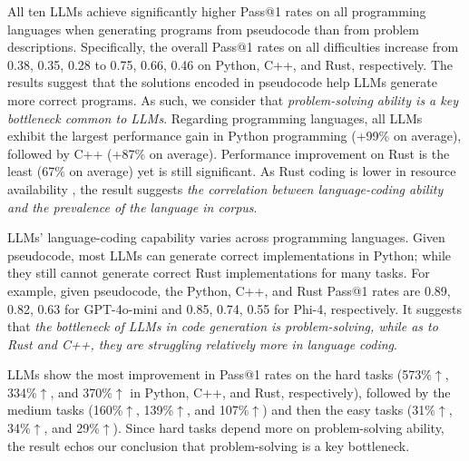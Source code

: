 All ten LLMs achieve significantly higher Pass@1 rates on all programming languages when generating programs from pseudocode than from problem descriptions. 
Specifically, the overall Pass@1 rates on all difficulties increase from 0.38, 0.35, 0.28 to 0.75, 0.66, 0.46 on Python, C++, and Rust, respectively.
The results suggest that the solutions encoded in pseudocode help LLMs generate more correct programs.
As such, we consider that \textit{problem-solving ability is a key bottleneck common to LLMs}.
Regarding programming languages, all LLMs exhibit the largest performance gain in Python programming (+99\% on average), followed by C++ (+87\% on average). Performance improvement on Rust is the least (67\% on average) yet is still significant. As Rust coding is lower in resource availability \cite{humanevalx,cao2025should}, the result suggests \textit{the correlation between language-coding ability and the prevalence of the language in corpus}.

LLMs' language-coding capability varies across programming languages. 
Given pseudocode, most LLMs can generate correct implementations in Python; while they still cannot generate correct Rust implementations for many tasks. For example, given pseudocode, the Python, C++, and Rust Pass@1 rates are 0.89, 0.82, 0.63 for GPT-4o-mini and 0.85, 0.74, 0.55 for Phi-4, respectively.
It suggests that \textit{the bottleneck of LLMs in code generation is problem-solving, while as to Rust and C++, they are struggling relatively more in language coding}. 

 LLMs show the most improvement in Pass@1 rates on the hard tasks (573\%$\uparrow$, 334\%$\uparrow$, and 370\%$\uparrow$ in Python, C++, and Rust, respectively), followed by the medium tasks (160\%$\uparrow$, 139\%$\uparrow$, and 107\%$\uparrow$) and then the easy tasks (31\%$\uparrow$, 34\%$\uparrow$, and 29\%$\uparrow$). Since hard tasks depend more on problem-solving ability, the result echos our conclusion that problem-solving is a key bottleneck.

